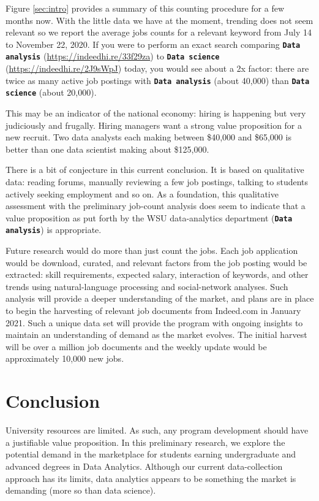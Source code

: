 \documentclass[]{article}
\begin{document}
Figure \ref{sec:intro} provides a summary of this counting procedure for
a few months now. With the little data we have at the moment, trending
does not seem relevant so we report the average jobs counts for a
relevant keyword from July 14 to November 22, 2020. If you were to
perform an exact search comparing \textbf{\tt{Data analysis}}
(\url{https://indeedhi.re/33f29za}) to \textbf{\tt{Data science}}
(\url{https://indeedhi.re/2J9sWpJ}) today, you would see about a 2x
factor: there are twice as many active job postings with
\textbf{\tt{Data analysis}} (about 40,000) than
\textbf{\tt{Data science}} (about 20,000).

\newpage

\noindent This may be an indicator of the national economy: hiring is
happening but very judiciously and frugally. Hiring managers want a
strong value proposition for a new recruit. Two data analysts each
making between \$40,000 and \$65,000 is better than one data scientist
making about \$125,000.

There is a bit of conjecture in this current conclusion. It is based on
qualitative data: reading forums, manually reviewing a few job postings,
talking to students actively seeking employment and so on. As a
foundation, this qualitative assessment with the preliminary job-count
analysis does seem to indicate that a value proposition as put forth by
the WSU data-analytics department (\textbf{\tt{Data analysis}}) is
appropriate.

Future research would do more than just count the jobs. Each job
application would be download, curated, and relevant factors from the
job posting would be extracted: skill requirements, expected salary,
interaction of keywords, and other trends using natural-language
processing and social-network analyses. Such analysis will provide a
deeper understanding of the market, and plans are in place to begin the
harvesting of relevant job documents from Indeed.com in January 2021.
Such a unique data set will provide the program with ongoing insights to
maintain an understanding of demand as the market evolves. The initial
harvest will be over a million job documents and the weekly update would
be approximately 10,000 new jobs.

\section{Conclusion}
\label{sec:conclusion}

University resources are limited. As such, any program development
should have a justifiable value proposition. In this preliminary
research, we explore the potential demand in the marketplace for
students earning undergraduate and advanced degrees in Data Analytics.
Although our current data-collection approach has its limits, data
analytics appears to be something the market is demanding (more so than
data science).
\end{document}
